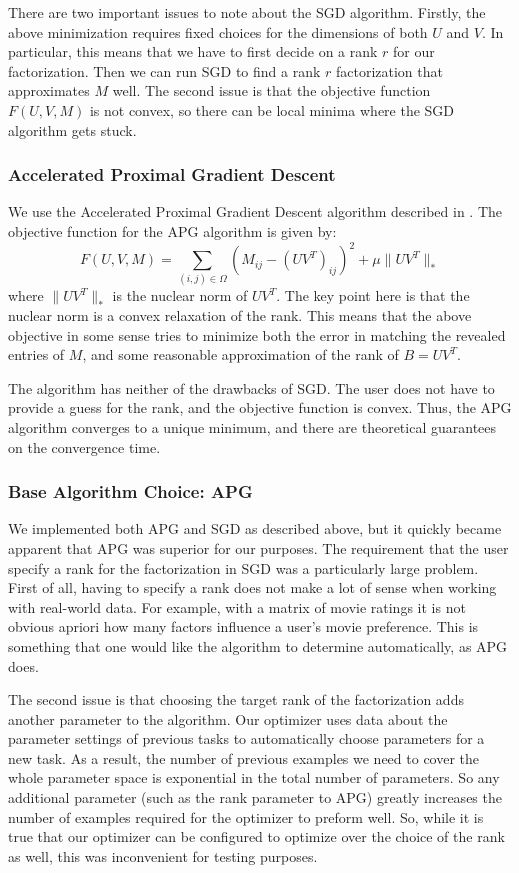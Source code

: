 There are two important issues to note about the SGD algorithm. 
Firstly, the above minimization requires fixed choices for the 
dimensions of both $U$ and $V$. In particular, this means that we 
have to first decide on a rank $r$ for our factorization. 
Then we can run SGD to find a rank $r$ factorization that 
approximates $M$ well. The second issue is that the objective 
function $F(U,V,M)$ is not convex, so there can be local minima 
where the SGD algorithm gets stuck.

\subsubsection{Accelerated Proximal Gradient Descent}
We use the Accelerated Proximal Gradient Descent algorithm 
described in \cite{TY10}. The objective function for the APG 
algorithm is given by:
\[
F(U,V,M) = \sum_{(i,j)\in \Omega} \left(M_{ij} - (UV^T)_{ij}\right)^2 + \mu \| UV^T\|_*
\]
where $\|UV^T\|_*$ is the nuclear norm of $UV^T$. The key point 
here is that the nuclear norm is a convex relaxation of the rank. 
This means that the above objective in some sense tries to minimize 
both the error in matching the revealed entries of $M$, and some 
reasonable approximation of the rank of $B=UV^T$.

The algorithm has neither of the drawbacks of SGD. The user does not 
have to provide a guess for the rank, and the objective function is 
convex. Thus, the APG algorithm converges to a unique minimum, 
and there are theoretical guarantees on the convergence time.

\subsubsection{Base Algorithm Choice: APG}
We implemented both APG and SGD as described above, but it quickly 
became apparent that APG was superior for our purposes. The requirement 
that the user specify a rank for the factorization in SGD was a 
particularly large problem. First of all, having to specify a rank 
does not make a lot of sense when working with real-world data. 
For example, with a matrix of movie ratings it is not obvious apriori 
how many factors influence a user's movie preference. This is something 
that one would like the algorithm to determine automatically, as APG does.

The second issue is that choosing the target rank of the factorization 
adds another parameter to the algorithm. Our optimizer uses data about 
the parameter settings of previous tasks to automatically choose 
parameters for a new task. As a result, the number of previous examples 
we need to cover the whole parameter space is exponential in the total 
number of parameters. So any additional parameter (such as the rank 
parameter to APG) greatly increases the number of examples required 
for the optimizer to preform well.
So, while it is true that our optimizer can be configured to optimize over
the choice of the rank as well, this was inconvenient for testing 
purposes.

